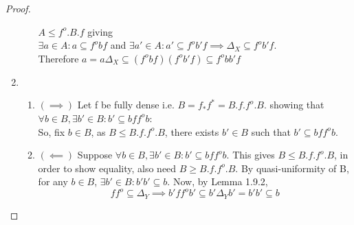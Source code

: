 \documentclass[18pt,a4paper]{article}
\theoremstyle{definition}
\begin{document}
\begin{proof}
\begin{enumerate}[label=(\alph*)]
\begin{enumerate}[label=(\roman*)]
						$A\leq f^o .B.f $
						giving\\ $\exists a \in A : a \subseteq f^o bf$ and
						$\exists a'\in A: a' \subseteq f^o b'f \implies \Delta_X \subseteq
						f^o b'	f$.\\
						Therefore $a=a\Delta_X \subseteq (f^o bf) (f^o b'f)
						\subseteq f^o bb'f$
				\end{enumerate}
			\item	\begin{enumerate}[label=(\roman*)]
				\item $(\implies )$ Let f be fully dense i.e. $B=f_*f^* = B.f.f^o.B$.
					showing that $\forall b \in B,\exists b'\in B: b'
					\subseteq bff^ob$:\\
					So, fix $b\in B$, as $B \leq B.f.f^o.B$, there exists $b' \in
					B$ such that $b' \subseteq bff^ob$.
				\item $(\impliedby)$ Suppose $\forall b \in B, \exists b' \in B:
					b' \subseteq bff^ob$. This gives $B\leq B.f.f^o .B$, in order
					to show equality, also need $B\geq B.f.f^o .B$.
					By quasi-uniformity of B, for any $b \in B$, $\exists b'\in B:b'b'
					\subseteq b$. Now, by Lemma 1.9.2,
					\[ f f^o \subseteq \Delta_Y \implies b'f f^o b' \subseteq b'
					\Delta_Y b'=b'b' \subseteq b\]


\end{enumerate}
\end{enumerate}
\end{proof}
\end{document}
